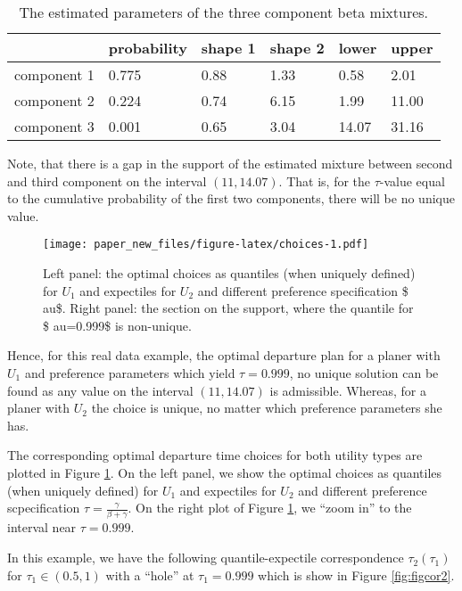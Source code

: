 \documentclass[
]{article}
\theoremstyle{definition}
\theoremstyle{definition}
\theoremstyle{definition}
\theoremstyle{definition}
\theoremstyle{remark}
\begin{document}
\begin{table}

\caption{\label{tab:tabpars}The estimated parameters of the three component beta mixtures.}
\centering
\begin{tabular}[t]{l|l|l|l|l|l}
\hline
  & probability & shape 1 & shape 2 & lower & upper\\
\hline
component 1 & 0.775 & 0.88 & 1.33 & 0.58 & 2.01\\
\hline
component 2 & 0.224 & 0.74 & 6.15 & 1.99 & 11.00\\
\hline
component 3 & 0.001 & 0.65 & 3.04 & 14.07 & 31.16\\
\hline
\end{tabular}
\end{table}

Note, that there is a gap in the support of the estimated mixture between second and third component on the interval \((11,14.07)\). That is, for the \(\tau\)-value equal to the cumulative probability of the first two components, there will be no unique value.

\begin{figure}
\centering
\texttt{[image: paper\_new\_files/figure-latex/choices-1.pdf]}
\caption{\label{fig:choices}Left panel: the optimal choices as quantiles (when uniquely defined) for \(U_1\) and expectiles for \(U_2\) and different preference specification \$ au\$. Right panel: the section on the support, where the quantile for \$ au=0.999\$ is non-unique.}
\end{figure}

Hence, for this real data example, the optimal departure plan for a planer with \(U_1\) and preference parameters which yield \(\tau=0.999\), no unique solution can be found as any value on the interval \((11,14.07)\) is admissible. Whereas, for a planer with \(U_2\) the choice is unique, no matter which preference parameters she has.

The corresponding optimal departure time choices for both utility types are plotted in Figure \ref{fig:choices}. On the left panel, we show the optimal choices as quantiles (when uniquely defined) for \(U_1\) and expectiles for \(U_2\) and different preference scpecification \(\tau=\frac{\gamma}{\beta+\gamma}\). On the right plot of Figure \ref{fig:choices}, we ``zoom in'' to the interval near \(\tau=0.999\).

In this example, we have the following quantile-expectile correspondence \(\tau_2(\tau_1)\) for \(\tau_1\in(0.5,1)\) with a ``hole'' at \(\tau_1=0.999\) which is show in Figure \ref{fig:figcor2}.
\end{document}
